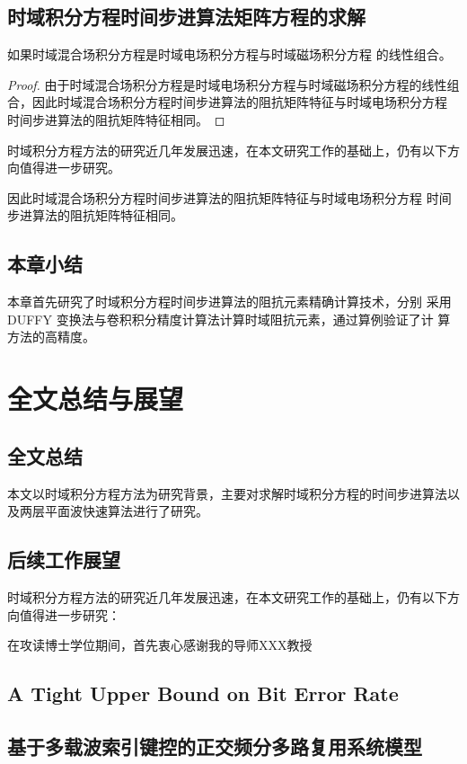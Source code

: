 \documentclass[master]{thesis-uestc}
\begin{document}
\section{时域积分方程时间步进算法矩阵方程的求解}

\begin{theorem}
如果时域混合场积分方程是时域电场积分方程与时域磁场积分方程
的线性组合。
\end{theorem}
\begin{proof}
由于时域混合场积分方程是时域电场积分方程与时域磁场积分方程的线性组
合，因此时域混合场积分方程时间步进算法的阻抗矩阵特征与时域电场积分方程
时间步进算法的阻抗矩阵特征相同。
\end{proof}
\begin{corollary}
时域积分方程方法的研究近几年发展迅速，在本文研究工作的基础上，仍有以下方向值得进一步研究。
\end{corollary}
\begin{lemma}
因此时域混合场积分方程时间步进算法的阻抗矩阵特征与时域电场积分方程
时间步进算法的阻抗矩阵特征相同。
\end{lemma}

\section{本章小结}
本章首先研究了时域积分方程时间步进算法的阻抗元素精确计算技术，分别
采用DUFFY 变换法与卷积积分精度计算法计算时域阻抗元素，通过算例验证了计
算方法的高精度。

\chapter{全文总结与展望}

\section{全文总结}
本文以时域积分方程方法为研究背景，主要对求解时域积分方程的时间步进算法以及两层平面波快速算法进行了研究。

\section{后续工作展望}
时域积分方程方法的研究近几年发展迅速，在本文研究工作的基础上，仍有以下方向值得进一步研究：

\thesisacknowledgement
在攻读博士学位期间，首先衷心感谢我的导师XXX教授




\thesisappendix



\thesistranslationoriginal
\section{A Tight Upper Bound on Bit Error Rate}


\thesistranslationchinese

\section{基于多载波索引键控的正交频分多路复用系统模型}
\end{document}
